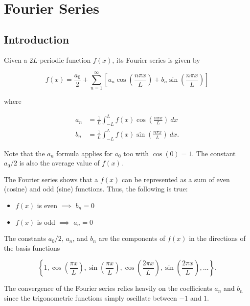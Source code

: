 \section{Fourier Series}

\subsection{Introduction}

Given a $2L$-periodic function $f(x)$, its Fourier series is given by

\begin{equation*}
    f(x) = \frac{a_0}{2} + \sum_{n=1}^\infty \left[ a_n \cos\left(\frac{n\pi x}{L}\right) + b_n \sin\left(\frac{n\pi x}{L}\right) \right]
\end{equation*}

where

\begin{align*}
    a_n & = \frac{1}{L}\int_{-L}^L f(x)\cos\left(\frac{n\pi x}{L}\right)~dx         \\
    b_n & = \frac{1}{L}\int_{-L}^L f(x)\sin\left(\frac{n\pi x}{L}\right)~dx\text{.}
\end{align*}

Note that the $a_n$ formula applies for $a_0$ too with $\cos(0) = 1$. The constant $a_0/2$ is also the average value of $f(x)$.

\vsp

The Fourier series shows that a $f(x)$ can be represented as a sum of even (cosine) and odd (sine) functions. Thus, the following is true:

\begin{itemize}
    \item $f(x)$ is even $\implies$ $b_n = 0$
    \item $f(x)$ is odd $\implies$ $a_n = 0$
\end{itemize}

\vsp

The constants $a_0/2$, $a_n$, and $b_n$ are the components of $f(x)$ in the directions of the basis functions

\begin{equation*}
    \left\{ 1, \cos\left(\frac{\pi x}{L}\right), \sin\left(\frac{\pi x}{L}\right), \cos\left(\frac{2\pi x}{L}\right), \sin\left(\frac{2\pi x}{L}\right), \dots \right\}\text{.}
\end{equation*}

The convergence of the Fourier series relies heavily on the coefficients $a_n$ and $b_n$ since the trigonometric functions simply oscillate between $-1$ and $1$.

